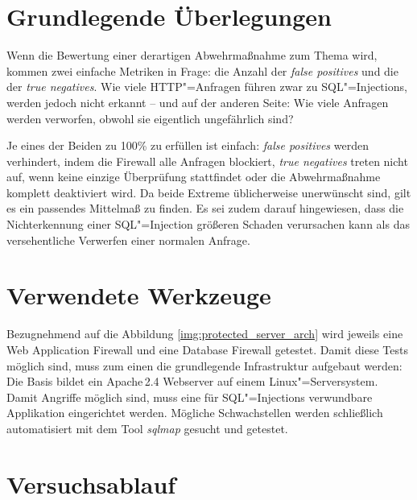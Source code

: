\section{Grundlegende Überlegungen}

Wenn die Bewertung einer derartigen Abwehrmaßnahme zum Thema wird, kommen zwei einfache Metriken in Frage: die Anzahl der \emph{false positives} und die der \emph{true negatives}. Wie viele HTTP"=Anfragen führen zwar zu SQL"=Injections, werden jedoch nicht erkannt -- und auf der anderen Seite: Wie viele Anfragen werden verworfen, obwohl sie eigentlich ungefährlich sind?

Je eines der Beiden zu 100\% zu erfüllen ist einfach: \emph{false positives} werden verhindert, indem die Firewall alle Anfragen blockiert, \emph{true negatives} treten nicht auf, wenn keine einzige Überprüfung stattfindet oder die Abwehrmaßnahme komplett deaktiviert wird. Da beide Extreme üblicherweise unerwünscht sind, gilt es ein passendes Mittelmaß zu finden. Es sei zudem darauf hingewiesen, dass die Nichterkennung einer SQL"=Injection größeren Schaden verursachen kann als das versehentliche Verwerfen einer normalen Anfrage.

\section{Verwendete Werkzeuge}

Bezugnehmend auf die Abbildung \ref{img:protected_server_arch} wird jeweils eine Web Application Firewall und eine Database Firewall getestet. Damit diese Tests möglich sind, muss zum einen die grundlegende Infrastruktur aufgebaut werden: Die Basis bildet ein Apache\,2.4 Webserver auf einem Linux"=Serversystem. Damit Angriffe möglich sind, muss eine für SQL"=Injections verwundbare Applikation eingerichtet werden. Mögliche Schwachstellen werden schließlich automatisiert mit dem Tool \emph{sqlmap} gesucht und getestet.

\section{Versuchsablauf}

